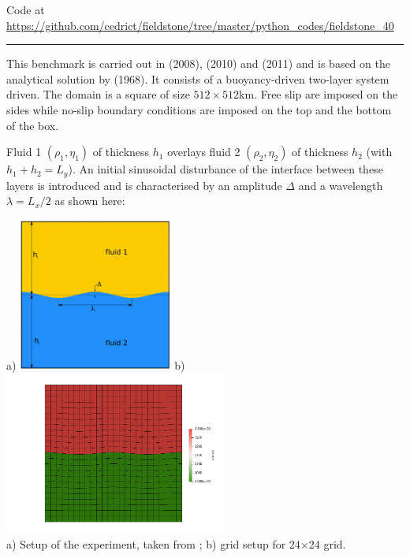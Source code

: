 

\begin{center}
Code at \url{https://github.com/cedrict/fieldstone/tree/master/python_codes/fieldstone_40}
\end{center}

\par\noindent\rule{\textwidth}{0.4pt}

This benchmark is carried out in \textcite{deka08} (2008), \textcite{gery10} (2010) and \textcite{thie11} (2011) 
and is based on the analytical solution by \textcite{ramb68} (1968). 
It consists of a buoyancy-driven two-layer system driven. 
The domain is a square of size $512\times512$km. 
Free slip are imposed on the sides while no-slip boundary conditions are imposed on the
top and the bottom of the box.

Fluid 1 $(\rho_1,\eta_1)$ of thickness $h_1$ overlays 
fluid 2 $(\rho_2,\eta_2)$ of thickness $h_2$ (with $h_1+h_2=L_y$).
An initial sinusoidal disturbance of the interface between these
layers is introduced and is characterised by an amplitude $\Delta$ and a
wavelength $\lambda=L_x/2$ as shown here: 

\begin{center}
a) \includegraphics[width=0.38\textwidth]{python_codes/fieldstone_40/images/setup}
b) \includegraphics[width=0.55\textwidth]{python_codes/fieldstone_40/images/dens}\\
{\captionfont  a) Setup of the experiment, taken from \cite{thie11}; b) grid setup for 24$\times$24 grid.} 
\end{center}

